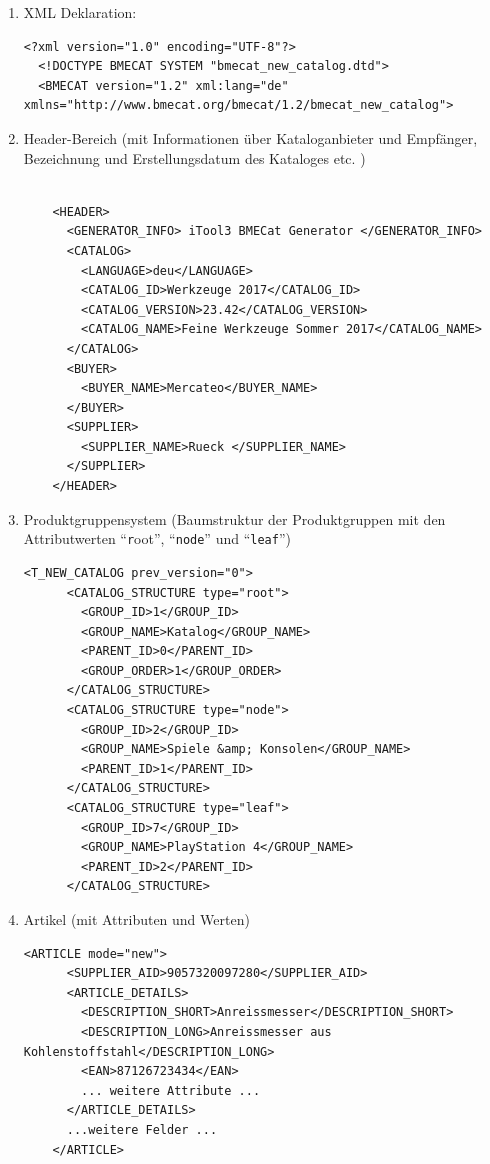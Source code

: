 	\begin{enumerate}
	
	\item 
	XML Deklaration:
	\begin{lstlisting}[caption={XML Deklaration in einem BMECat-Dokument}] 
  <?xml version="1.0" encoding="UTF-8"?>
  <!DOCTYPE BMECAT SYSTEM "bmecat_new_catalog.dtd">
  <BMECAT version="1.2" xml:lang="de" xmlns="http://www.bmecat.org/bmecat/1.2/bmecat_new_catalog">
	\end{lstlisting}
	
	\item
	Header-Bereich (mit Informationen über Kataloganbieter und Empfänger, Bezeichnung und Erstellungsdatum des Kataloges etc.  )
	\begin{lstlisting}[caption={Header-Sektion in einem BMECat-Dokument}]  %vernünftige Daten	
	
	<HEADER>
	  <GENERATOR_INFO> iTool3 BMECat Generator </GENERATOR_INFO>
	  <CATALOG>
	    <LANGUAGE>deu</LANGUAGE>
	    <CATALOG_ID>Werkzeuge 2017</CATALOG_ID>
	    <CATALOG_VERSION>23.42</CATALOG_VERSION>
	    <CATALOG_NAME>Feine Werkzeuge Sommer 2017</CATALOG_NAME>
	  </CATALOG>
	  <BUYER>
	    <BUYER_NAME>Mercateo</BUYER_NAME>
	  </BUYER>
	  <SUPPLIER>
	    <SUPPLIER_NAME>Rueck </SUPPLIER_NAME>
	  </SUPPLIER>
	</HEADER>
	\end{lstlisting}
		\pagebreak
		\item Produktgruppensystem (Baumstruktur der Produktgruppen mit den Attributwerten \enquote{\texttt
		root}, \enquote{\texttt{node}} und \enquote{\texttt{leaf}})
		\begin{lstlisting}[caption={Produktgruppensystem in einem BMECat-Dokument }] 
	<T_NEW_CATALOG prev_version="0">		
	  <CATALOG_STRUCTURE type="root">
	    <GROUP_ID>1</GROUP_ID>
	    <GROUP_NAME>Katalog</GROUP_NAME>
	    <PARENT_ID>0</PARENT_ID>
	    <GROUP_ORDER>1</GROUP_ORDER>
	  </CATALOG_STRUCTURE>
	  <CATALOG_STRUCTURE type="node">
	    <GROUP_ID>2</GROUP_ID>
	    <GROUP_NAME>Spiele &amp; Konsolen</GROUP_NAME>
	    <PARENT_ID>1</PARENT_ID>
	  </CATALOG_STRUCTURE>
	  <CATALOG_STRUCTURE type="leaf">
	    <GROUP_ID>7</GROUP_ID>
	    <GROUP_NAME>PlayStation 4</GROUP_NAME>
	    <PARENT_ID>2</PARENT_ID>
	  </CATALOG_STRUCTURE>
		\end{lstlisting}
		
		
		
\item Artikel (mit Attributen und Werten)

\begin{lstlisting}[caption={Ein Artikel in einem BMECat-Dokument }] 
	<ARTICLE mode="new">
	  <SUPPLIER_AID>9057320097280</SUPPLIER_AID>
	  <ARTICLE_DETAILS>
	    <DESCRIPTION_SHORT>Anreissmesser</DESCRIPTION_SHORT>
	    <DESCRIPTION_LONG>Anreissmesser aus Kohlenstoffstahl</DESCRIPTION_LONG>
	    <EAN>87126723434</EAN>
	    ... weitere Attribute ...
	  </ARTICLE_DETAILS>
	  ...weitere Felder ...
	</ARTICLE>
\end{lstlisting}
		


\end{enumerate}
